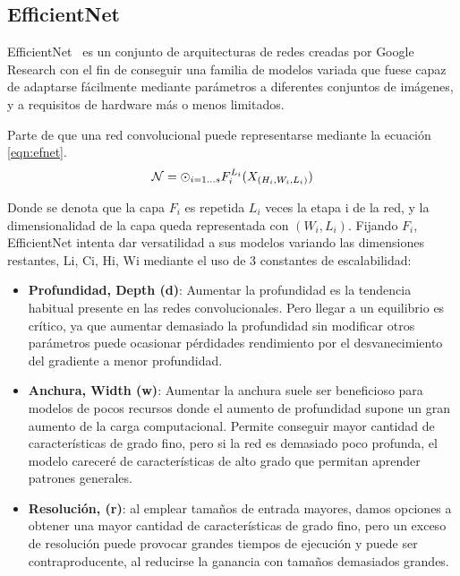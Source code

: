 \subsection{EfficientNet}
\label{efnetcap}

EfficientNet~\cite{Chaturvedi_2020} es un conjunto de arquitecturas de redes creadas por Google Research con el fin de conseguir una familia de modelos variada que fuese capaz de adaptarse fácilmente mediante parámetros a diferentes conjuntos de imágenes, y a requisitos de hardware más o menos limitados. 

Parte de que una red convolucional puede representarse mediante la ecuación \ref{eqn:efnet}.
      \begin{equation}\label{eqn:efnet}
	\centering
	\mathcal{N}=\odot_{i=1...s} F_i^{L_i}(X_{(H_i, W_i,L_i)})
\end{equation}

Donde se denota que la capa $F_i$ es repetida $L_i$ veces la etapa i de la red, y la dimensionalidad de la capa queda representada con ${( W_i,L_i)}$.  Fijando $F_i$, EfficientNet intenta dar versatilidad a sus modelos variando las dimensiones restantes, Li, Ci, Hi, Wi mediante el uso de 3 constantes de escalabilidad:

\begin{itemize}
	 \item  \textbf{Profundidad, Depth (d)}:  Aumentar la profundidad es la tendencia habitual presente en las redes convolucionales. Pero llegar a un equilibrio es crítico, ya que aumentar demasiado la profundidad sin modificar otros parámetros puede ocasionar pérdidades rendimiento por el desvanecimiento del gradiente  a menor profundidad. 
	\item  \textbf{Anchura, Width (w)}: Aumentar la anchura suele ser beneficioso para modelos de pocos recursos donde el aumento de profundidad supone un gran aumento de la carga computacional. Permite conseguir mayor cantidad de características de grado fino, pero si la red es demasiado poco profunda, el modelo careceré de características de alto grado que permitan aprender patrones generales.
	\item  \textbf{Resolución, (r)}: al emplear tamaños de entrada mayores, damos opciones a obtener una mayor cantidad de características de grado fino, pero un exceso de resolución puede provocar grandes tiempos de ejecución y puede ser contraproducente, al reducirse la ganancia con tamaños demasiados grandes.
\end{itemize}

